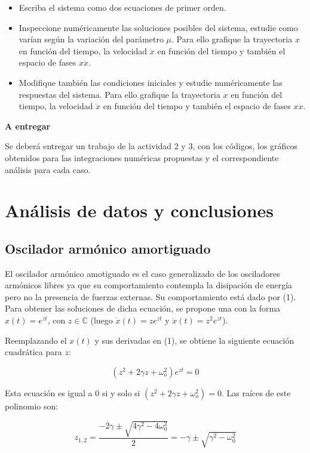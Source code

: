 \documentclass[a4paper,12pt]{article}
\begin{document}
\begin{itemize}
\item Escriba el sistema como dos ecuaciones de primer orden.
\item Inspeccione num\'ericamente las soluciones posibles del sistema, estudie como var\'ian seg\'un la variaci\'on del par\'ametro $\mu$. Para ello grafique la trayectoria $x$ en funci\'on del tiempo, la velocidad $\ddot{x}$ en funci\'on del tiempo y tambi\'en el espacio de fases $x  \ddot{x}$.
\item Modifique tambi\'en las condiciones iniciales y estudie num\'ericamente las respuestas del sistema. Para ello grafique la trayectoria $x$ en funci\'on del tiempo, la velocidad $\ddot{x}$ en funci\'on del tiempo y tambi\'en el espacio de fases $x  \ddot{x}$.
\end{itemize}


{\Large \textbf{A entregar}}

Se deber\'a entregar un trabajo de la actividad 2 y 3, con los c\'odigos, los gr\'aficos obtenidos para las integraciones num\'ericas propuestas y el correspondiente an\'alisis para cada caso.


\section{An\'alisis de datos y conclusiones}
\subsection{Oscilador arm\'onico amortiguado}

El oscilador arm\'onico amotiguado es el caso generalizado de los osciladores arm\'onicos libres ya que su comportamiento contempla la disipaci\'on de energ\'ia pero no la presencia de fuerzas externas. Su comportamiento est\'a dado por (1).
Para obtener las soluciones de dicha ecuaci\'on, se propone una con la forma $x(t) = e^{zt}$, con $z \in \mathbb{C}$ (luego $\dot{x}(t) = ze^{zt}$ y $\ddot{x}(t) = z^2e^{zt}$).

Reemplazando el $x(t)$ y sus derivadas en (1), se obtiene la siguiente ecuaci\'on cuadr\'atica para $z$:

$$
(z^2 + 2\gamma z + \omega_o^2)e^{zt}=0
$$

Esta ecuaci\'on es igual a 0 si y solo si $(z^2 + 2\gamma z + \omega_o^2) = 0$. Las ra\'ices de este polinomio son:

$$
z_{1,2} = \frac{-2\gamma \pm \sqrt{4\gamma^2 - 4\omega_0^2}}{2} = -\gamma \pm \sqrt{\gamma^2 - \omega_0^2}
$$
\end{document}
